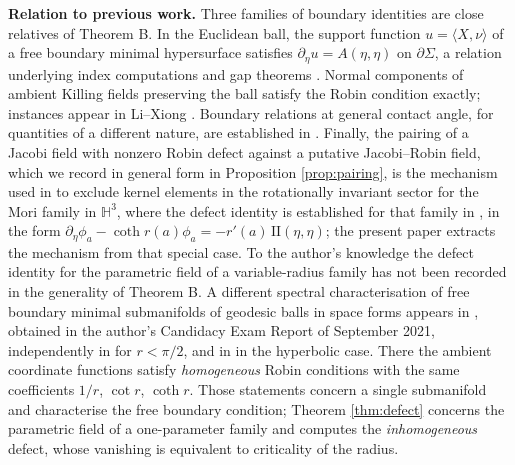 \documentclass[11pt,a4paper]{amsart}
\theoremstyle{plain}
\theoremstyle{definition}
\newcommand{\Hyp}{\mathbb{H}}
\begin{document}
\medskip
\noindent\textbf{Relation to previous work.} Three families of boundary identities are close relatives of Theorem B. In the Euclidean ball, the support function $u=\langle X,\nu\rangle$ of a free boundary minimal hypersurface satisfies $\partial_\eta u=A(\eta,\eta)$ on $\partial\Sigma$, a relation underlying index computations and gap theorems \cite{FS16,AN16,Dev19,Tra20,SZ19}. Normal components of ambient Killing fields preserving the ball satisfy the Robin condition exactly; instances appear in Li--Xiong \cite[eq. (26)]{LX18}. Boundary relations at general contact angle, for quantities of a different nature, are established in \cite[Lem. 2.9]{NZ1}. Finally, the pairing of a Jacobi field with nonzero Robin defect against a putative Jacobi--Robin field, which we record in general form in Proposition \ref{prop:pairing}, is the mechanism used in \cite{P1} to exclude kernel elements in the rotationally invariant sector for the Mori family in $\Hyp^3$, where the defect identity is established for that family in \cite[Lem. 8.3]{P1}, in the form $\partial_\eta\phi_a-\coth r(a)\phi_a=-r'(a)\,\mathrm{II}(\eta,\eta)$; the present paper extracts the mechanism from that special case. To the author's knowledge the defect identity for the parametric field of a variable-radius family has not been recorded in the generality of Theorem B.
A different spectral characterisation of free boundary minimal submanifolds of geodesic balls in space forms appears in \cite[Prop.~2.6, Thms.~2.7--2.8]{dO-thesis}, obtained in the author's Candidacy Exam Report of September 2021, independently in \cite[Prop.~1]{LM23} for $r<\pi/2$, and in \cite[Prop.~2.1]{Med23} in the hyperbolic case. There the ambient coordinate functions satisfy \emph{homogeneous} Robin conditions with the same coefficients $1/r$, $\cot r$, $\coth r$. Those statements concern a single submanifold and characterise the free boundary condition; Theorem \ref{thm:defect} concerns the parametric field of a one-parameter family and computes the \emph{inhomogeneous} defect, whose vanishing is equivalent to criticality of the radius.
\end{document}
